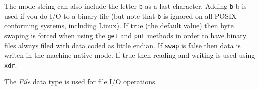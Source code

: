\begin{parameters}
\begin{varlist}
\begin{description}
    \end{description}
    The mode string can also include the letter \verb+b+ as a last character. 
    Adding \verb+b+ b is used if you do I/O to a binary file 
    (but note that \verb+b+ is ignored on all POSIX conforming systems, including Linux).
     If true (the default value) then byte swaping is forced when using the \verb+get+ and 
    \verb+put+ methods in order to have binary files always filed with data coded as little endian. 
    If \verb+swap+ is false then data is writen in the machine native mode. 
     If true then reading and writing is used using \verb+xdr+.
  \end{varlist}
\end{parameters}

\begin{mandescription}
The \emph{File} data type is used for file I/O operations.
\end{mandescription}


